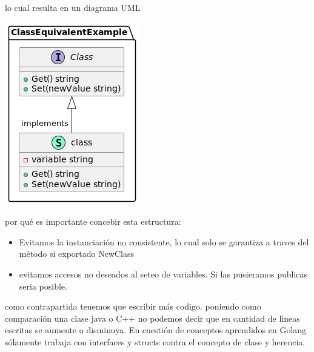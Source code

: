 lo cual resulta en un diagrama UML

\includegraphics{./part/Proyecto_ejecutivo/memoria_constructiva/ClassEquivalentInGolang}

por qué es importante concebir esta estructura:

\begin{itemize}
    \item Evitamos la instanciación no consistente, lo cual solo se garantiza a traves del método si exportado NewClass
    \item evitamos accesos no deseados al seteo de variables. Si las pusieramos publicas seria posible.
\end{itemize}

como contrapartida tenemos que escribir más codigo. poniendo como comparación una clase java o C++ no podemos decir que en cantidad de lineas escritas se aumente o disminuya. En cuestión de conceptos aprendidos en Golang sólamente trabaja con interfaces y structs contra el concepto de clase y herencia.

